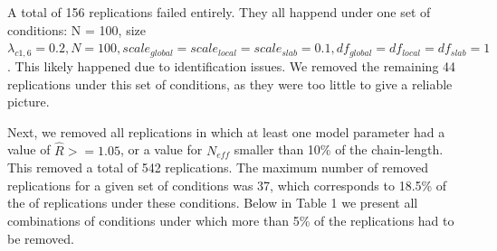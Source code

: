 \documentclass[
  man, donotrepeattitle,floatsintext]{apa6}
\begin{document}
A total of 156 replications failed entirely. They all happend under one set of conditions: N = 100, size \(\lambda_{c1,6} = 0.2, N = 100, scale_{global} = scale_{local} = scale_{slab} = 0.1, df_{global} = df_{local} = df_{slab} = 1\). This likely happened due to identification issues. We removed the remaining 44 replications under this set of conditions, as they were too little to give a reliable picture.

Next, we removed all replications in which at least one model parameter had a value of \(\hat{R} >= 1.05\), or a value for \(N_{eff}\) smaller than 10\% of the chain-length. This removed a total of 542 replications. The maximum number of removed replications for a given set of conditions was 37, which corresponds to 18.5\% of the of replications under these conditions. Below in Table 1 we present all combinations of conditions under which more than 5\% of the replications had to be removed.
\end{document}
